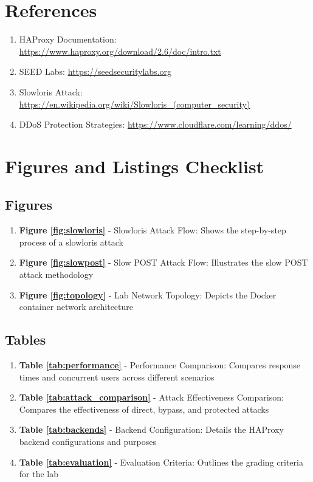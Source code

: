 \documentclass[12pt]{article}
\begin{document}
\section{References}

\begin{enumerate}
    \item HAProxy Documentation: \url{https://www.haproxy.org/download/2.6/doc/intro.txt}
    \item SEED Labs: \url{https://seedsecuritylabs.org}
    \item Slowloris Attack: \url{https://en.wikipedia.org/wiki/Slowloris_(computer_security)}
    \item DDoS Protection Strategies: \url{https://www.cloudflare.com/learning/ddos/}
\end{enumerate}

\section{Figures and Listings Checklist}

\subsection{Figures}
\begin{enumerate}
    \item \textbf{Figure \ref{fig:slowloris}} - Slowloris Attack Flow: Shows the step-by-step process of a slowloris attack
    \item \textbf{Figure \ref{fig:slowpost}} - Slow POST Attack Flow: Illustrates the slow POST attack methodology
    \item \textbf{Figure \ref{fig:topology}} - Lab Network Topology: Depicts the Docker container network architecture
\end{enumerate}

\subsection{Tables}
\begin{enumerate}
    \item \textbf{Table \ref{tab:performance}} - Performance Comparison: Compares response times and concurrent users across different scenarios
    \item \textbf{Table \ref{tab:attack_comparison}} - Attack Effectiveness Comparison: Compares the effectiveness of direct, bypass, and protected attacks
    \item \textbf{Table \ref{tab:backends}} - Backend Configuration: Details the HAProxy backend configurations and purposes
    \item \textbf{Table \ref{tab:evaluation}} - Evaluation Criteria: Outlines the grading criteria for the lab
\end{enumerate}
\end{document}
